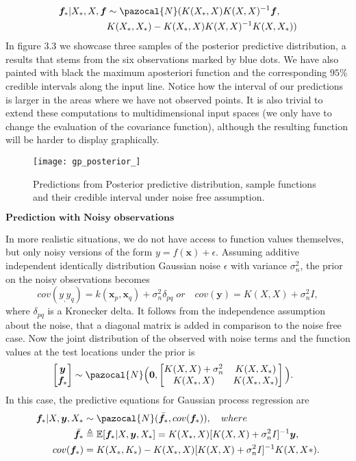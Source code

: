 \documentclass[12pt,a4paper,oneside]{book}
\theoremstyle{plain}
\theoremstyle{definition}
\begin{document}
{\begin{align*}
\bm{f}_*|X_*,X,\bm{f} &\sim \pazocal{N} (K(X_*,X)K(X,X)^{-1}\bm{f}, \\
&K(X_*,X_*)-K(X_*,X)K(X,X)^{-1}K(X,X_*))
\end{align*}
In figure 3.3 we showcase three samples of the posterior predictive distribution, a results that stems from the six observations marked by blue dots. We have also painted with black the maximum aposteriori function and the corresponding $95\%$ credible intervals along the input line. Notice how the interval of our predictions is larger in the areas where we have not observed points. It is also trivial to extend these computations to multidimensional input spaces (we only have to change the evaluation of the covariance function), although the resulting function will be harder to display graphically. 

\begin{figure}[h]
\begin{center}
\texttt{[image: gp\_posterior\_]}
\caption{Predictions from Posterior predictive distribution, sample functions and their credible interval under noise free assumption.}
\end{center}
\end{figure} 

\vspace{8mm}
\begin{flushleft}
$\textbf{Prediction with Noisy observations}$
\end{flushleft}
\vspace{3mm}
In more realistic situations, we do not have access to function values themselves, but only noisy versions of the form $y=f(\bm{x})+\epsilon.$ Assuming additive independent identically distribution Gaussian noise $\epsilon$ with variance $\sigma_n^2$, the prior on the noisy observations becomes $$cov(y_,y_q)=k(\bm{x}_p,\bm{x}_q)+\sigma_n^2 \delta_{pq}\;or\quad cov(\bm{y})=K(X,X)+\sigma_n^2 I,$$ where $\delta_{pq}$ is a Kronecker delta. It follows from the independence assumption about the noise, that a diagonal matrix is added in comparison to the noise free case. Now the joint distribution of the observed with noise terms and the function values at the test locations under the prior is 
\begin{align*}
\begin{bmatrix}
\bm{y} \\
\bm{f}_*
\end{bmatrix}
& \sim \pazocal{N}\Big{(} \bm{0},\begin{bmatrix}
K(X,X) +\sigma_n^2 & K(X,X_*) \\
K(X_*,X) & K(X_*,X_*)
\end{bmatrix} \Big{)}.
\end{align*}
In this case, the predictive equations for Gaussian process regression are 
\begin{align*}
\bm{f}_*|X,\bm{y},X_* &\sim \pazocal{N}(\bar{\bm{f}}_*,cov(\bm{f}_*)),\quad where \\
\bar{\bm{f}}_*&\triangleq \mathbb{E}[\bm{f}_*|X,\bm{y},X_*]=K(X_*,X)[K(X,X)+\sigma_n^2I]^{-1}\bm{y},\\
cov(\bm{f}_*)&=K(X_*,K_*)-K(X_*,X)[K(X,X)+\sigma_n^2I]^{-1}K(X,X*).
\end{align*}

}
\end{document}
